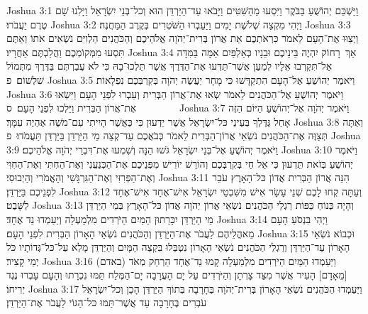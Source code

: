 Joshua 3:1	וַיַּשְׁכֵּם יְהוֹשֻׁעַ בַּבֹּקֶר וַיִּסְעוּ מֵהַשִּׁטִּים וַיָּבֹאוּ עַד־הַיַּרְדֵּן הוּא וְכל־בְּנֵי יִשְׂרָאֵל וַיָּלִנוּ שָׁם טֶרֶם יַעֲבֹרוּ׃
Joshua 3:2	וַיְהִי מִקְצֵה שְׁלֹשֶׁת יָמִים וַיַּעַבְרוּ הַשֹּׁטְרִים בְּקֶרֶב הַמַּחֲנֶה׃
Joshua 3:3	וַיְצַוּוּ אֶת־הָעָם לֵאמֹר כִּרְאֹתְכֶם אֵת אֲרוֹן בְּרִית־יְהֹוָה אֱלֹהֵיכֶם וְהַכֹּהֲנִים הַלְוִיִּם נֹשְׂאִים אֹתוֹ וְאַתֶּם תִּסְעוּ מִמְּקוֹמְכֶם וַהֲלַכְתֶּם אַחֲרָיו׃
Joshua 3:4	אַךְ  רָחוֹק יִהְיֶה בֵּינֵיכֶם וּבֵנָיו כְּאַלְפַּיִם אַמָּה בַּמִּדָּה אַל־תִּקְרְבוּ אֵלָיו לְמַעַן אֲשֶׁר־תֵּדְעוּ אֶת־הַדֶּרֶךְ אֲשֶׁר תֵּלְכוּ־בָהּ כִּי לֹא עֲבַרְתֶּם בַּדֶּרֶךְ מִתְּמוֹל שִׁלְשׁוֹם׃ {פ}
Joshua 3:5	וַיֹּאמֶר יְהוֹשֻׁעַ אֶל־הָעָם הִתְקַדָּשׁוּ כִּי מָחָר יַעֲשֶׂה יְהֹוָה בְּקִרְבְּכֶם נִפְלָאוֹת׃
Joshua 3:6	וַיֹּאמֶר יְהוֹשֻׁעַ אֶל־הַכֹּהֲנִים לֵאמֹר שְׂאוּ אֶת־אֲרוֹן הַבְּרִית וְעִבְרוּ לִפְנֵי הָעָם וַיִּשְׂאוּ אֶת־אֲרוֹן הַבְּרִית וַיֵּלְכוּ לִפְנֵי הָעָם׃ {ס}        
Joshua 3:7	וַיֹּאמֶר יְהֹוָה אֶל־יְהוֹשֻׁעַ הַיּוֹם הַזֶּה אָחֵל גַּדֶּלְךָ בְּעֵינֵי כּל־יִשְׂרָאֵל אֲשֶׁר יֵדְעוּן כִּי כַּאֲשֶׁר הָיִיתִי עִם־מֹשֶׁה אֶהְיֶה עִמָּךְ׃
Joshua 3:8	וְאַתָּה תְּצַוֶּה אֶת־הַכֹּהֲנִים נֹשְׂאֵי אֲרוֹן־הַבְּרִית לֵאמֹר כְּבֹאֲכֶם עַד־קְצֵה מֵי הַיַּרְדֵּן בַּיַּרְדֵּן תַּעֲמֹדוּ׃ {פ}
Joshua 3:9	וַיֹּאמֶר יְהוֹשֻׁעַ אֶל־בְּנֵי יִשְׂרָאֵל גֹּשׁוּ הֵנָּה וְשִׁמְעוּ אֶת־דִּבְרֵי יְהֹוָה אֱלֹהֵיכֶם׃
Joshua 3:10	וַיֹּאמֶר יְהוֹשֻׁעַ בְּזֹאת תֵּדְעוּן כִּי אֵל חַי בְּקִרְבְּכֶם וְהוֹרֵשׁ יוֹרִישׁ מִפְּנֵיכֶם אֶת־הַכְּנַעֲנִי וְאֶת־הַחִתִּי וְאֶת־הַחִוִּי וְאֶת־הַפְּרִזִּי וְאֶת־הַגִּרְגָּשִׁי וְהָאֱמֹרִי וְהַיְבוּסִי׃
Joshua 3:11	הִנֵּה אֲרוֹן הַבְּרִית אֲדוֹן כּל־הָאָרֶץ עֹבֵר לִפְנֵיכֶם בַּיַּרְדֵּן׃
Joshua 3:12	וְעַתָּה קְחוּ לָכֶם שְׁנֵי עָשָׂר אִישׁ מִשִּׁבְטֵי יִשְׂרָאֵל אִישׁ־אֶחָד אִישׁ־אֶחָד לַשָּׁבֶט׃
Joshua 3:13	וְהָיָה כְּנוֹחַ כַּפּוֹת רַגְלֵי הַכֹּהֲנִים נֹשְׂאֵי אֲרוֹן יְהֹוָה אֲדוֹן כּל־הָאָרֶץ בְּמֵי הַיַּרְדֵּן מֵי הַיַּרְדֵּן יִכָּרֵתוּן הַמַּיִם הַיֹּרְדִים מִלְמָעְלָה וְיַעַמְדוּ נֵד אֶחָד׃
Joshua 3:14	וַיְהִי בִּנְסֹעַ הָעָם מֵאהֳלֵיהֶם לַעֲבֹר אֶת־הַיַּרְדֵּן וְהַכֹּהֲנִים נֹשְׂאֵי הָאָרוֹן הַבְּרִית לִפְנֵי הָעָם׃
Joshua 3:15	וּכְבוֹא נֹשְׂאֵי הָאָרוֹן עַד־הַיַּרְדֵּן וְרַגְלֵי הַכֹּהֲנִים נֹשְׂאֵי הָאָרוֹן נִטְבְּלוּ בִּקְצֵה הַמָּיִם וְהַיַּרְדֵּן מָלֵא עַל־כּל־גְּדוֹתָיו כֹּל יְמֵי קָצִיר׃
Joshua 3:16	וַיַּעַמְדוּ הַמַּיִם הַיֹּרְדִים מִלְמַעְלָה קָמוּ נֵד־אֶחָד הַרְחֵק מְאֹד (באדם) [מֵאָדָם] הָעִיר אֲשֶׁר מִצַּד צָרְתָן וְהַיֹּרְדִים עַל יָם הָעֲרָבָה יָם־הַמֶּלַח תַּמּוּ נִכְרָתוּ וְהָעָם עָבְרוּ נֶגֶד יְרִיחוֹ׃
Joshua 3:17	וַיַּעַמְדוּ הַכֹּהֲנִים נֹשְׂאֵי הָאָרוֹן בְּרִית־יְהֹוָה בֶּחָרָבָה בְּתוֹךְ הַיַּרְדֵּן הָכֵן וְכל־יִשְׂרָאֵל עֹבְרִים בֶּחָרָבָה עַד אֲשֶׁר־תַּמּוּ כּל־הַגּוֹי לַעֲבֹר אֶת־הַיַּרְדֵּן׃
